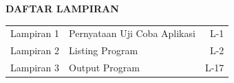 
\thispagestyle{chapterpage}

\vspace*{-2cm}

\begin{center}
  {\bfseries\fontsize{12}{14}\selectfont DAFTAR LAMPIRAN}
\end{center}

\vspace{2\baselineskip}

{\singlespacing
\noindent
\begin{tabularx}{\textwidth}{l X r}
  Lampiran 1 & Pernyataan Uji Coba Aplikasi & L-1 \\[0.5em]
  Lampiran 2 & Listing Program              & L-2 \\[0.5em]
  Lampiran 3 & Output Program               & L-17 \\
\end{tabularx}
}

\newpage
